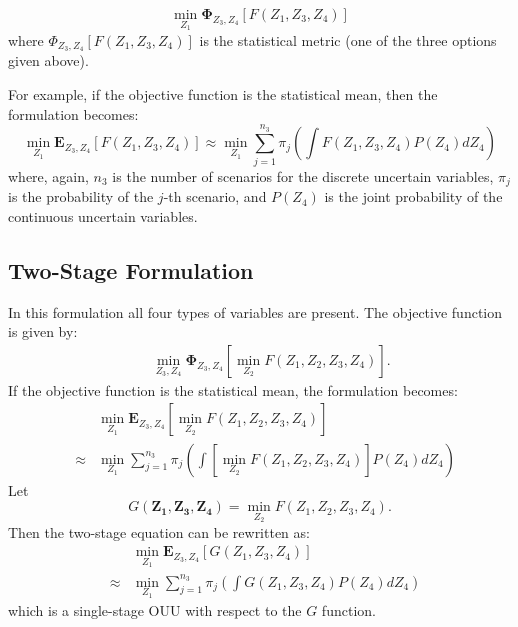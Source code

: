 \begin{equation}
\min_{Z_1} \mathbf{\Phi}_{Z_3,Z_4} 
\left[ F(Z_1,Z_3,Z_4)
\right]
\end{equation}
where
$\Phi_{Z_3,Z_4} [F(Z_1,Z_3,Z_4)]$ is the statistical
metric (one of the three options given above).

For example, if the objective function is the statistical
mean, then the formulation becomes:
\begin{equation}
\min_{Z_1} \mathbf{E}_{Z_3,Z_4} [F(Z_1,Z_3,Z_4)]  
\approx 
\min_{Z_1} {
\sum^{n_3}_{j=1} \pi_j \left( 
\int {F(Z_1,Z_3,Z_4)  
P(Z_4) d Z_4} \right)}
\end{equation}
where, again, $n_3$ is the number of scenarios
for the discrete uncertain variables, $\pi_j$ is the
probability of the $j$-th scenario, and $P(Z_4)$ is the 
joint probability of the continuous uncertain variables.

\subsection{Two-Stage Formulation}

In this formulation all four types of variables are present.
The objective function is given by:
\begin{equation}
\begin{array}{lcl}
& & \displaystyle \min_{Z_3,Z_4}
\mathbf{\Phi}_{Z_3,Z_4} \left[
\min_{Z_2} 
F(Z_1,Z_2,Z_3,Z_4) \right]. 
\end{array}
\end{equation}
If the objective function is the statistical mean, the
formulation becomes:
\begin{equation}
\begin{array}{lcl}
& & \displaystyle \min_{Z_1}
\mathbf{E}_{Z_3,Z_4} \left[
\min_{Z_2} F(Z_1,Z_2,Z_3,Z_4) \right]\\ 
&\approx& \displaystyle \min_{Z_1} \sum^{n_3}_{j=1} \pi_j 
\left( 
\int \left[
\min_{Z_2} F(Z_1,Z_2,Z_3,Z_4) \right] P(Z_4) d Z_4
\right)
\end{array}
\end{equation}
Let
\begin{equation}
G(\mathbf{Z_1,Z_3,Z_4}) = \min_{Z_2} F(Z_1,Z_2,Z_3,Z_4).
\end{equation}
Then the two-stage equation can be rewritten as:
\begin{equation}
\begin{array}{lcl}
& & \displaystyle \min_{Z_1}
\mathbf{E}_{Z_3,Z_4} \left[
G(Z_1,Z_3,Z_4) \right]\\ 
&\approx& \displaystyle \min_{Z_1} \sum^{n_3}_{j=1} \pi_j 
\left( \int 
G(Z_1,Z_3,Z_4) P(Z_4) d Z_4
\right)
\end{array}
\end{equation}
which is a single-stage OUU with respect to the $G$ function.

